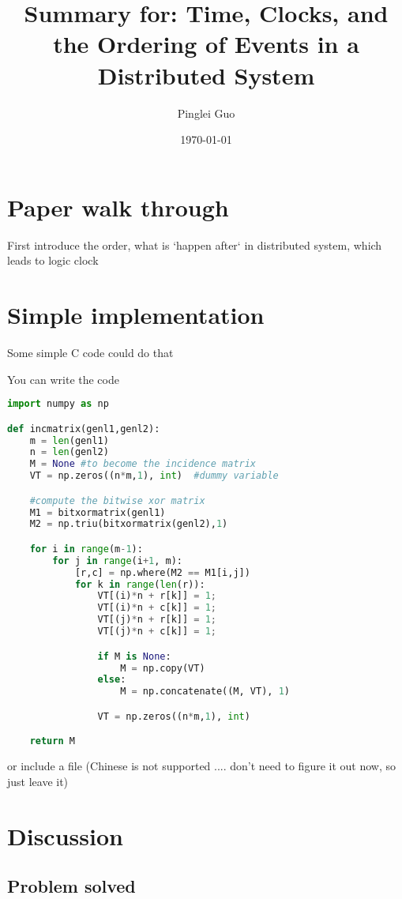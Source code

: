 \documentclass[12pt,a4paper,oneside]{article}
\title{Summary for: Time, Clocks, and the Ordering of Events in a Distributed System}
\author{Pinglei Guo}
\date{\today}
\begin{document}
\maketitle

\section{Paper walk through}

First introduce the order, what is `happen after` in distributed system, which
leads to logic clock

\section{Simple implementation}

Some simple C code could do that

You can write the code
\begin{lstlisting}[language=Python]
import numpy as np

def incmatrix(genl1,genl2):
    m = len(genl1)
    n = len(genl2)
    M = None #to become the incidence matrix
    VT = np.zeros((n*m,1), int)  #dummy variable

    #compute the bitwise xor matrix
    M1 = bitxormatrix(genl1)
    M2 = np.triu(bitxormatrix(genl2),1)

    for i in range(m-1):
        for j in range(i+1, m):
            [r,c] = np.where(M2 == M1[i,j])
            for k in range(len(r)):
                VT[(i)*n + r[k]] = 1;
                VT[(i)*n + c[k]] = 1;
                VT[(j)*n + r[k]] = 1;
                VT[(j)*n + c[k]] = 1;

                if M is None:
                    M = np.copy(VT)
                else:
                    M = np.concatenate((M, VT), 1)

                VT = np.zeros((n*m,1), int)

    return M
\end{lstlisting}

or include a file (Chinese is not supported .... don't need to figure it out now, so just leave it)




\section{Discussion}

\subsection{Problem solved}
\end{document}
